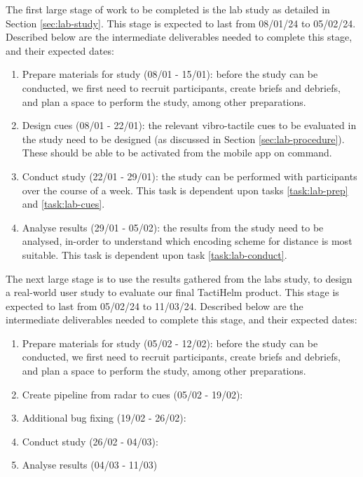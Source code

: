 \documentclass{interim}
\begin{document}
The first large stage of work to be completed is the lab study as detailed in Section \ref{sec:lab-study}. This stage is expected to last from 08/01/24 to 05/02/24. Described below are the intermediate deliverables needed to complete this stage, and their expected dates: 
\begin{enumerate}[label=1.\arabic*]
    \item Prepare materials for study (08/01 - 15/01): before the study can be conducted, we first need to recruit participants, create briefs and debriefs, and plan a space to perform the study, among other preparations.\label{task:lab-prep}
    \item Design cues (08/01 - 22/01): the relevant vibro-tactile cues to be evaluated in the study need to be designed (as discussed in Section \ref{sec:lab-procedure}). These should be able to be activated from the mobile app on command. \label{task:lab-cues}
    \item Conduct study (22/01 - 29/01): the study can be performed with participants over the course of a week. This task is dependent upon tasks \ref{task:lab-prep} and \ref{task:lab-cues}. \label{task:lab-conduct}
    \item Analyse results (29/01 - 05/02): the results from the study need to be analysed, in-order to understand which encoding scheme for distance is most suitable. This task is dependent upon task \ref{task:lab-conduct}.
\end{enumerate}

The next large stage is to use the results gathered from the labs study, to design a real-world user study to evaluate our final TactiHelm product. This stage is expected to last from 05/02/24 to 11/03/24. Described below are the intermediate deliverables needed to complete this stage, and their expected dates: 
\begin{enumerate}[label=2.\arabic*]
    \item Prepare materials for study (05/02 - 12/02): before the study can be conducted, we first need to recruit participants, create briefs and debriefs, and plan a space to perform the study, among other preparations.
    \item Create pipeline from radar to cues (05/02 - 19/02):
    \item Additional bug fixing (19/02 - 26/02):
    \item Conduct study (26/02 - 04/03):
    \item Analyse results (04/03 - 11/03)
\end{enumerate}
\end{document}
